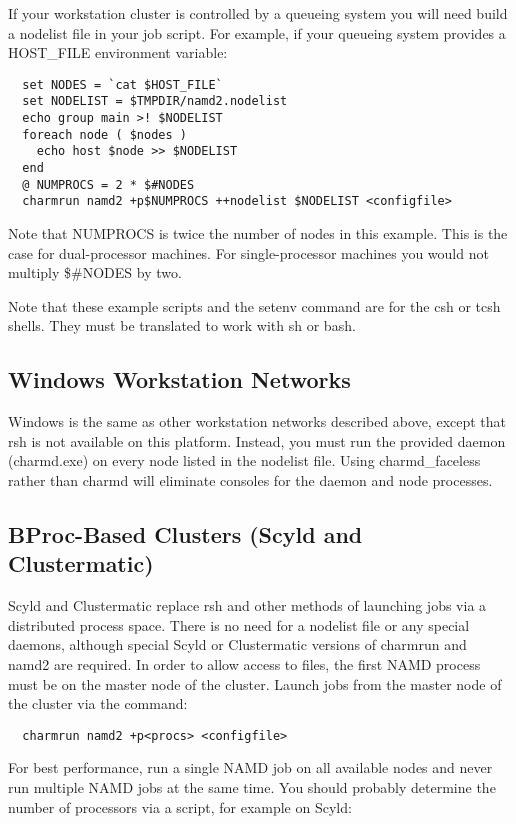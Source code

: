 If your workstation cluster is controlled by a queueing system you
will need build a nodelist file in your job script.  For example, if
your queueing system provides a HOST\_FILE environment variable:

\begin{verbatim}
  set NODES = `cat $HOST_FILE`
  set NODELIST = $TMPDIR/namd2.nodelist
  echo group main >! $NODELIST
  foreach node ( $nodes )
    echo host $node >> $NODELIST
  end
  @ NUMPROCS = 2 * $#NODES
  charmrun namd2 +p$NUMPROCS ++nodelist $NODELIST <configfile>
\end{verbatim}

Note that NUMPROCS is twice the number of nodes in this example.
This is the case for dual-processor machines.  For single-processor
machines you would not multiply \$\#NODES by two.

Note that these example scripts and the setenv command are for the csh
or tcsh shells.  They must be translated to work with sh or bash.

\subsection{Windows Workstation Networks}

Windows is the same as other workstation networks described above,
except that rsh is not available on this platform.  Instead, you must
run the provided daemon (charmd.exe) on every node listed in the
nodelist file.  Using charmd\_faceless rather than charmd will eliminate
consoles for the daemon and node processes.

\subsection{BProc-Based Clusters (Scyld and Clustermatic)}

Scyld and Clustermatic replace rsh and other methods of launching jobs
via a distributed process space.  There is no need for a nodelist file
or any special daemons, although special Scyld or Clustermatic versions
of charmrun and namd2 are required.  In order to allow access to files,
the first NAMD process must be on the master node of the cluster.
Launch jobs from the master node of the cluster via the command:

\begin{verbatim}
  charmrun namd2 +p<procs> <configfile>
\end{verbatim}

For best performance, run a single NAMD job on all available nodes and
never run multiple NAMD jobs at the same time.  You should probably
determine the number of processors via a script, for example on Scyld:

